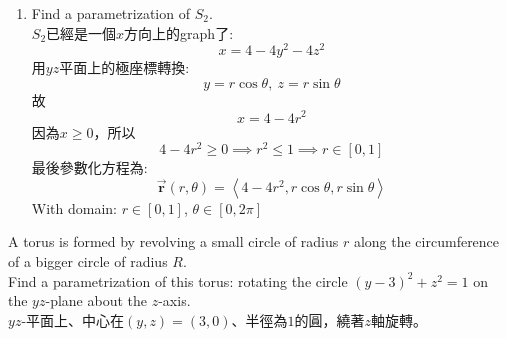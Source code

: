 ﻿\documentclass[12pt,a4paper]{article}
\begin{document}
\begin{problems}
\begin{enumerate}
  改寫方程:
  \begin{equation}
     \frac{x^2}{4}+y^2+z^2 = 1
  \end{equation}
  這是個有Semi-axis在$x$方向上是$2$，在$y$和$z$方向上都是$1$的橢球體
  用橢球座標轉換:
  \begin{equation}
    x = 2\cos\phi,~
    y = \sin\phi\cos\theta,~
    z = \sin\phi\sin\theta
  \end{equation}
  因為$x\leq0$
  \begin{equation}
     2\cos\phi \leq 0\implies \cos\phi \leq 0
  \end{equation}
  所以
  \begin{equation}
    \frac{\pi}{2}\leq\phi\leq\pi
  \end{equation}
  因此參數化方程為
  \begin{equation}
    \vec{\mathbf{r}}(\phi,\theta) = \left<
      2\cos\phi, \sin\phi\cos\theta, \sin\phi\sin\theta
    \right>,~\frac{\pi}{2}\leq\phi\leq\pi,~0\leq\theta\leq2\pi
  \end{equation}
  \item Find a parametrization of $S_2$.\\
  $S_2$已經是一個$x$方向上的graph了:
  \begin{equation}
    x=4-4y^2-4z^2
  \end{equation}
  用$yz$平面上的極座標轉換:
  \begin{equation}
    y=r\cos\theta,~z=r\sin\theta
  \end{equation}
  故
  \begin{equation}
    x=4-4r^2
  \end{equation}
  因為$x\geq0$，所以
  \begin{equation}
    4 - 4r^2 \geq 0 \implies r^2 \leq 1 \implies r\in[0,1]
  \end{equation}
  最後參數化方程為:
  \begin{equation}
    \vec{\mathbf{r}}(r,\theta) = \left<
      4-4r^2, r\cos\theta, r\sin\theta
    \right>
  \end{equation}
  With domain:
  $r\in[0,1]$, $\theta \in [0,2\pi]$
\end{enumerate}
\problem{}
A torus is formed by revolving a small circle of radius $r$ along the circumference of a bigger circle of
radius $R$.\\
Find a parametrization of this torus: rotating the circle $(y-3)^2+z^2 = 1$ on the $yz$-plane about the $z$-axis.\\
$yz$-平面上、中心在$(y,z) = (3,0)$、半徑為$1$的圓，繞著$z$軸旋轉。
\begin{equation}

\end{equation}
\end{problems}
\end{document}
